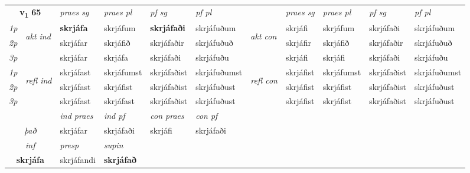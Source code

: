 \noindent
\begin{tabular}{lllllllllll} \toprule
\multicolumn{2}{c}{\textbf{v{\textsubscript{1}}} \Large{\textbf{65}}}  &  \textit{praes sg}  & \textit{praes pl}  &\textit{ pf sg} & \textit{pf pl} &  &  \textit{praes sg}  & \textit{praes pl}  & \textit{pf sg} & \textit{pf pl } \\*
	\cmidrule{3-6} \cmidrule{8-11}
 {\textit{1p}} & \multirow{3}{*}{\begin{turn}{90}\textit{akt ind}\end{turn}} & \textbf{skrjáfa} & skrjáfum & \textbf{skrjáfaði} & skrjáfuðum & \multirow{3}{*}{\begin{turn}{90}\textit{akt con}\end{turn}} &skrjáfi & skrjáfum & skrjáfaði & skrjáfuðum\\*
 {\textit{2p}} &  &  skrjáfar  & skrjáfið & skrjáfaðir & skrjáfuðuð & & skrjáfir & skrjáfið & skrjáfaðir & skrjáfuðuð \\*
{\textit{3p}} &  & skrjáfar & skrjáfa & skrjáfaði & skrjáfuðu & & skrjáfi & skrjáfi& skrjáfaði & skrjáfuðu \\*
\cmidrule{3-6} \cmidrule{8-11}
 {\textit{1p}} & \multirow{3}{*}{\begin{turn}{90}\textit{refl ind}\end{turn}}  & skrjáfast & skrjáfumst & skrjáfaðist & skrjáfuðumst & \multirow{3}{*}{\begin{turn}{90}\textit{refl con}\end{turn}}  &skrjáfist & skrjáfumst & skrjáfaðist & skrjáfuðumst \\*
 {\textit{2p}} &  & skrjáfast & skrjáfist & skrjáfaðist & skrjáfuðust & &skrjáfist & skrjáfist & skrjáfaðist & skrjáfuðust \\*
 {\textit{3p}}  & & skrjáfast & skrjáfast & skrjáfaðist & skrjáfuðust & & skrjáfist & skrjáfist& skrjáfaðist & skrjáfuðust \\*
\cmidrule{3-6} \cmidrule{8-11}

   & &  \textit{ind praes} & \textit{ind pf} & \textit{con praes} & \textit{con pf} \\*
\multicolumn{2}{c}{ \textit{það} } & skrjáfar & skrjáfaði & skrjáfi & skrjáfaði \\*

\cmidrule{3-4}
   \multicolumn{2}{c}{\textit{inf}}     & \textit{presp} & \textit{supin}   \\*
  \multicolumn{2}{c}{\textbf{skrjáfa}}      & skrjáfandi &  \textbf{skrjáfað}   \\*
\end{tabular}

